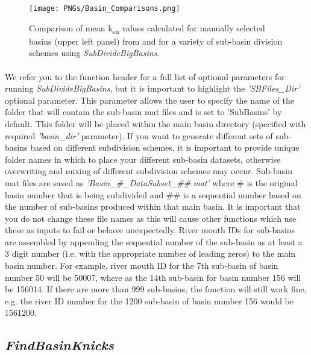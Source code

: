 \begin{figure}[H]
	\texttt{[image: PNGs/Basin\_Comparisons.png]}
	\caption{Comparison of mean k\textsubscript{sn} values calculated for manually selected basins (upper left panel) from  and for a variety of sub-basin division schemes using \textit{SubDivideBigBasins}.}
	\label{fig:BasinsComp}
\end{figure}

\paragraph{}We refer you to the function header for a full list of optional parameters for running \textit{SubDivideBigBasins}, but it is important to highlight the \textit{'SBFiles\_Dir'} optional parameter. This parameter allows the user to specify the name of the folder that will contain the sub-basin mat files and is set to 'SubBasins' by default. This folder will be placed within the main basin directory (specified with required \textit{'basin\_dir'} parameter). If you want to generate different sets of sub-basins based on different subdivision schemes, it is important to provide unique folder names in which to place your different sub-basin datasets, otherwise overwriting and mixing of different subdivision schemes may occur. Sub-basin mat files are saved as \textit{'Basin\_\#\_DataSubset\_\#\#.mat'} where \# is the original basin number that is being subdivided and \#\# is a sequential number based on the number of sub-basins produced within that main basin. It is important that you do not change these file names as this will cause other functions which use these as inputs to fail or behave unexpectedly. River mouth IDs for sub-basins are assembled by appending the sequential number of the sub-basin as at least a 3 digit number (i.e. with the appropriate number of leading zeros) to the main basin number. For example, river mouth ID for the 7th sub-basin of basin number 50 will be 50007, where as the 14th sub-basin for basin number 156 will be 156014. If there are more than 999 sub-basins, the function will still work fine, e.g. the river ID number for the 1200 sub-basin of basin number 156 would be 1561200.

\subsection{\textit{FindBasinKnicks}} \label{sec:BsnKncks}
